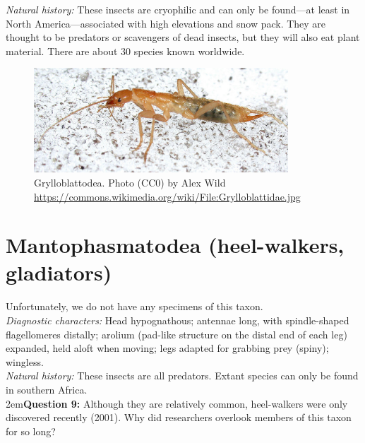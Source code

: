 \documentclass[letterpaper, 11pt]{article}
\begin{document}
\noindent{}\textit{Natural history:} These insects are cryophilic and can only be found---at least in North America---associated with high elevations and snow pack. They are thought to be predators or scavengers of dead insects, but they will also eat plant material. There are about 30 species known worldwide.\\

\begin{figure}[ht!]
  \centering
    \includegraphics[width=0.85\textwidth]{grylloblattidae}
  \caption{Grylloblattodea. Photo (CC0) by Alex Wild \url{https://commons.wikimedia.org/wiki/File:Grylloblattidae.jpg}}
  \label{fig:grylloblatt}
\end{figure}

\section{Mantophasmatodea (heel-walkers, gladiators)}

\noindent{}Unfortunately, we do not have any specimens of this taxon.\\

\noindent{}\textit{Diagnostic characters:} Head hypognathous; antennae long, with spindle-shaped flagellomeres distally; arolium (pad-like structure on the distal end of each leg) expanded, held aloft when moving; legs adapted for grabbing prey (spiny); wingless.\\

\noindent{}\textit{Natural history:} These insects are all predators. Extant species can only be found in southern Africa.\\

\hangindent2em\textbf{Question 9:} Although they are relatively common, heel-walkers were only discovered recently (2001). Why did researchers overlook members of this taxon for so long? \\
\end{document}
